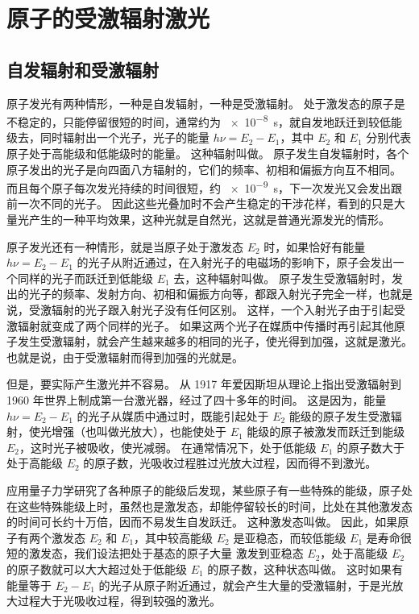 \section{原子的受激辐射\texorpdfstring{\quad}{ }激光}
\subsection{自发辐射和受激辐射}

原子发光有两种情形，一种是自发辐射，一种是受激辐射。
处于激发态的原子是不稳定的，只能停留很短的时间，通常约为 \qty{e-8}{s}，就自发地跃迁到较低能级去，同时辐射出一个光子，光子的能量 $h\nu =E_2-E_1$，其中 $E_2$ 和 $E_1$ 分别代表原子处于高能级和低能级时的能量。
这种辐射叫做。
原子发生自发辐射时，各个原子发出的光子是向四面八方辐射的，它们的频率、初相和偏振方向互不相同。
而且每个原子每次发光持续的时间很短，约 \qty{e-9}{s}，下一次发光又会发出跟前一次不同的光子。
因此这些光叠加时不会产生稳定的干涉花样，看到的只是大量光产生的一种平均效果，这种光就是自然光，这就是普通光源发光的情形。

原子发光还有一种情形，就是当原子处于激发态 $E_2$ 时，如果恰好有能量 $h\nu =E_2-E_1$ 的光子从附近通过，在入射光子的电磁场的影响下，原子会发出一个同样的光子而跃迁到低能级 $E_1$ 去，这种辐射叫做。
原子发生受激辐射时，发出的光子的频率、发射方向、初相和偏振方向等，都跟入射光子完全一样，也就是说，受激辐射的光子跟入射光子没有任何区别。
这样，一个入射光子由于引起受激辐射就变成了两个同样的光子。
如果这两个光子在媒质中传播时再引起其他原子发生受激辐射，就会产生越来越多的相同的光子，使光得到加强，这就是激光。
也就是说，由于受激辐射而得到加强的光就是。

但是，要实际产生激光并不容易。
从 1917 年爱因斯坦从理论上指出受激辐射到 1960 年世界上制成第一台激光器，经过了四十多年的时间。
这是因为，能量 $h\nu =E_2-E_1$ 的光子从媒质中通过时，既能引起处于 $E_2$ 能级的原子发生受激辐射，使光增强（也叫做光放大），也能使处于 $E_1$ 能级的原子被激发而跃迁到能级 $E_2$，这时光子被吸收，使光减弱。
在通常情况下，处于低能级 $E_1$ 的原子数大于处于高能级 $E_2$ 的原子数，光吸收过程胜过光放大过程，因而得不到激光。

应用量子力学研究了各种原子的能级后发现，某些原子有一些特殊的能级，原子处在这些特殊能级上时，虽然也是激发态，却能停留较长的时间，比处在其他激发态的时间可长约十万倍，因而不易发生自发跃迁。
这种激发态叫做。
因此，如果原子有两个激发态 $E_2$ 和 $E_1$，其中较高能级 $E_2$ 是亚稳态，而较低能级 $E_1$ 是寿命很短的激发态，我们设法把处于基态的原子大量 激发到亚稳态 $E_2$，处于高能级 $E_2$ 的原子数就可以大大超过处于低能级 $E_1$ 的原子数，这种状态叫做。
这时如果有能量等于 $E_2-E_1$ 的光子从原子附近通过，就会产生大量的受激辐射，于是光放大过程大于光吸收过程，得到较强的激光。

